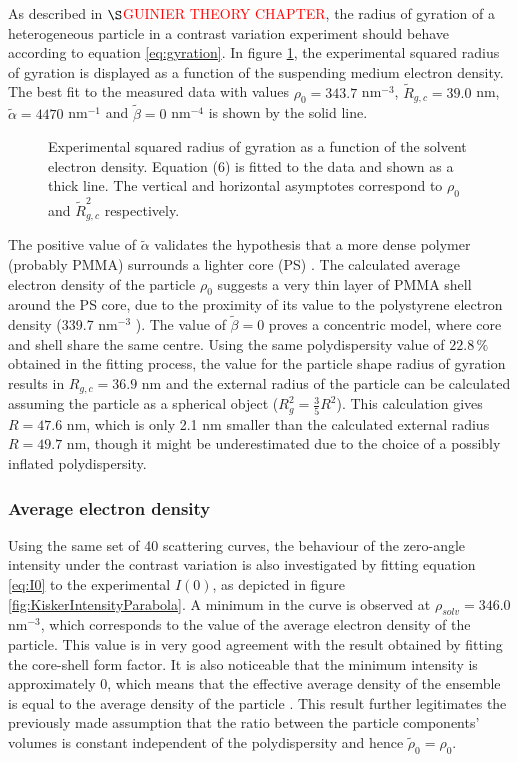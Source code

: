 As described in \(\S\)\textcolor{red}{GUINIER THEORY CHAPTER}, the radius of gyration of a heterogeneous particle in a contrast variation experiment should behave according to equation \eqref{eq:gyration}. In figure \ref{fig:KiskerGuinierRadius}, the experimental squared radius of gyration is displayed as a function of the suspending medium electron density. The best fit to the measured data with values \(\rho_0=343.7\) nm\(^{-3}\), \( \tilde R_{g,c}=39.0\) nm, \(\tilde \alpha=4470\) nm\(^{-1}\) and \(\tilde\beta=0\) nm\(^{-4}\) is shown by the solid line. 

\begin{figure}%
	\centering
		
		\caption{Experimental squared radius of gyration as a function of the solvent electron density. Equation (6) is fitted to the data and shown as a thick line. The vertical and horizontal asymptotes correspond to $\rho_0$ and $\tilde R^2_{g,c}$ respectively.}
		\label{fig:KiskerGuinierRadius}
\end{figure}

The positive value of \(\tilde\alpha\) validates the hypothesis that a more dense polymer (probably PMMA) surrounds a lighter core (PS) \cite{stuhrmann_small-angle_2008}. The calculated average electron density of the particle \(\rho_0\) suggests a very thin layer of PMMA shell around the PS core, due to the proximity of its value to the polystyrene electron density (339.7 nm\(^{-3}\) ). The value of \( \tilde\beta=0\) proves a concentric model, where core and shell share the same centre. Using the same polydispersity value of \(22.8\,\%\) obtained in the fitting process, the value for the particle shape radius of gyration results in \(R_{g,c}=36.9\) nm and the external radius of the particle can be calculated assuming the particle as a spherical object (\( R_g^2=\frac{3}{5}R^2 \)). This calculation gives \( R=47.6\) nm, which is only 2.1 nm smaller than the calculated external radius \(R=49.7\) nm, though it might be underestimated due to the choice of a possibly inflated polydispersity. 

\subsubsection{Average electron density}
Using the same set of 40 scattering curves, the behaviour of the zero-angle intensity under the contrast variation is also investigated by fitting equation \eqref{eq:I0} to the experimental \(I(0)\), as depicted in figure \ref{fig:KiskerIntensityParabola}. A minimum in the curve is observed at \(\rho_{solv}=346.0\) nm\(^{-3}\), which corresponds to the value of the average electron density of the particle. This value is in very good agreement with the result obtained by fitting the core-shell form factor. It is also noticeable that the minimum intensity is approximately 0, which means that the effective average density of the ensemble is equal to the average density of the particle \cite{avdeev_contrast_2007-1}. This result further legitimates the previously made assumption that the ratio between the particle components' volumes is constant independent of the polydispersity and hence \(  \tilde \rho_0 = \rho_0  \).

